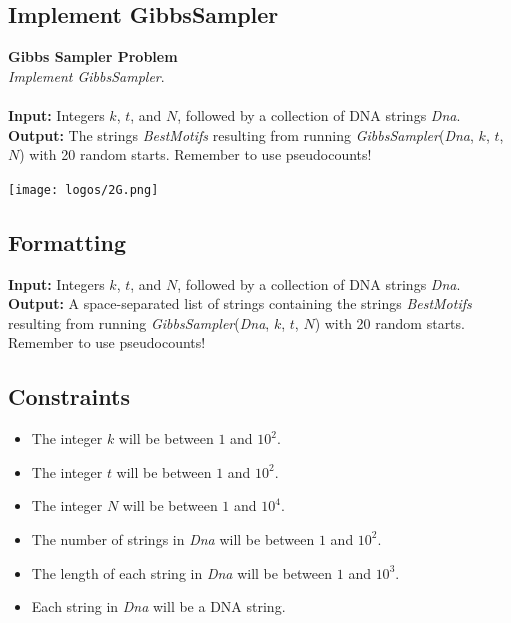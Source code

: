 \documentclass{article}
\begin{document}
\subsection{Implement GibbsSampler}
\hline\vspace{5}
\noindent\textbf{Gibbs Sampler Problem}\\
\emph{Implement GibbsSampler}.\\ \\
\noindent\textbf{Input:} Integers $k$, $t$, and $N$, followed by a collection of DNA strings \emph{Dna}.\\
\noindent\textbf{Output:} The strings \emph{BestMotifs} resulting from running \emph{GibbsSampler}(\emph{Dna}, $k$, $t$, $N$) with 20 random starts. Remember to use pseudocounts!
\begin{center}
    \texttt{[image: logos/2G.png]} 
\end{center}
\hline\vspace{5}

\subsection*{Formatting}
\noindent\textbf{Input:} Integers $k$, $t$, and $N$, followed by a collection of DNA strings \emph{Dna}.\\
\noindent\textbf{Output:} A space-separated list of strings containing the strings \emph{BestMotifs} resulting from running \emph{GibbsSampler}(\emph{Dna}, $k$, $t$, $N$) with 20 random starts. Remember to use pseudocounts!

\subsection*{Constraints}
\begin{itemize}
    \item The integer $k$ will be between $1$ and $10^2$.
    \item The integer $t$ will be between $1$ and $10^2$.
    \item The integer $N$ will be between $1$ and $10^4$.
    \item The number of strings in \emph{Dna} will be between $1$ and $10^2$.
    \item The length of each string in \emph{Dna} will be between $1$ and $10^3$.
    \item Each string in \emph{Dna} will be a DNA string.
\end{itemize}
\pagebreak
\end{document}
